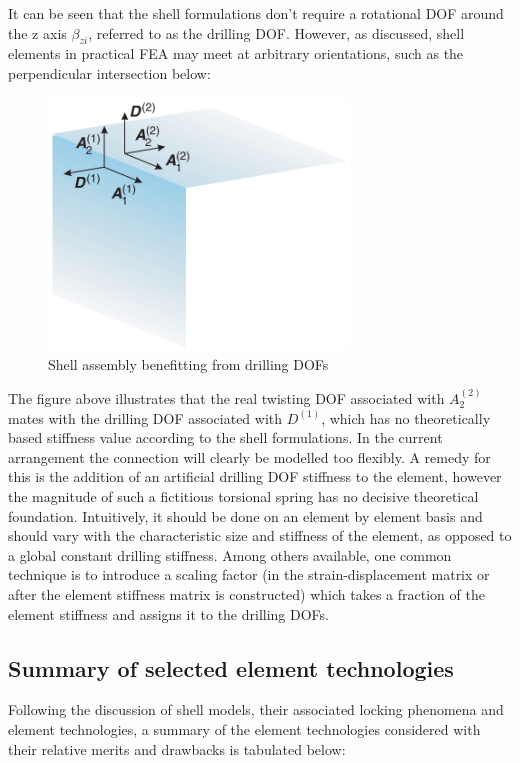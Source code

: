 It can be seen that the shell formulations don't require a rotational DOF around the z axis $\beta_{zi}$, referred to as the drilling DOF. However, as discussed, shell elements in practical FEA may meet at arbitrary orientations, such as the perpendicular intersection below:

\begin{figure}[H]
	\centering
	\def\svgwidth{\columnwidth}
	\includegraphics[width=8cm]{images/drillingDOF.png}
	\caption{Shell assembly benefitting from drilling DOFs \cite{BischLitBook04}}
	\label{shellModels}
\end{figure}

The figure above illustrates that the real twisting DOF associated with $A_2^{(2)}$ mates with the drilling DOF associated with $D^{(1)}$, which has no theoretically based stiffness value according to the shell formulations. In the current arrangement the connection will clearly be modelled too flexibly.  A remedy for this is the addition of an artificial drilling DOF stiffness to the element, however the magnitude of such a fictitious torsional spring has no decisive theoretical foundation. Intuitively, it should be done on an element by element basis and should vary with the characteristic size and stiffness of the element, as opposed to a global constant drilling stiffness. Among others available, one common technique is to introduce a scaling factor (in the strain-displacement matrix or after the element stiffness matrix is constructed) which takes a fraction of the element stiffness and assigns it to the drilling DOFs. 

\subsection{Summary of selected element technologies}

Following the discussion of shell models, their associated locking phenomena and element technologies, a summary of the element technologies considered with their relative merits and drawbacks is tabulated below:

